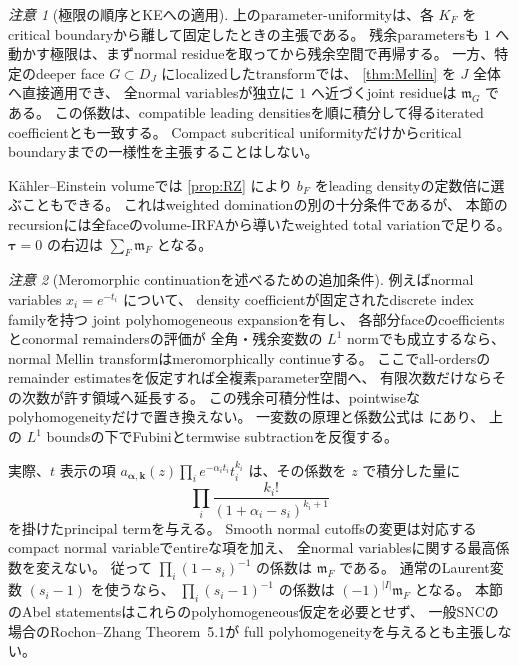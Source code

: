 \documentclass[11pt,a4paper]{ltjsarticle}
\theoremstyle{plain}
\theoremstyle{definition}
\theoremstyle{remark}
\newtheorem{remark}[remark]{注意}
\begin{document}
\begin{remark}[極限の順序とKEへの適用]
上のparameter-uniformityは、各 $K_F$ をcritical boundaryから離して固定したときの主張である。
残余parametersも $1$ へ動かす極限は、まずnormal residueを取ってから残余空間で再帰する。
一方、特定のdeeper face $G\subset D_J$ にlocalizedしたtransformでは、
\cref{thm:Mellin} を $J$ 全体へ直接適用でき、
全normal variablesが独立に $1$ へ近づくjoint residueは $\mathfrak m_G$ である。
この係数は、compatible leading densitiesを順に積分して得るiterated coefficientとも一致する。
Compact subcritical uniformityだけからcritical boundaryまでの一様性を主張することはしない。

K\"ahler--Einstein volumeでは \cref{prop:RZ} により
$b_F$ をleading densityの定数倍に選ぶこともできる。
これはweighted dominationの別の十分条件であるが、
本節のrecursionには全faceのvolume-IRFAから導いたweighted total variationで足りる。
$\bm\tau=0$ の右辺は $\sum_F\mathfrak m_F$ となる。
\end{remark}

\begin{remark}[Meromorphic continuationを述べるための追加条件]
\label{rem:Mellin-continuation}
例えばnormal variables $x_i=e^{-t_i}$ について、
density coefficientが固定されたdiscrete index familyを持つ
joint polyhomogeneous expansionを有し、
各部分faceのcoefficientsとconormal remaindersの評価が
全角・残余変数の $L^1$ normでも成立するなら、
normal Mellin transformはmeromorphically continueする。
ここでall-ordersのremainder estimatesを仮定すれば全複素parameter空間へ、
有限次数だけならその次数が許す領域へ延長する。
この残余可積分性は、pointwiseなpolyhomogeneityだけで置き換えない。
一変数の原理と係数公式は
\cite[Theorem~2.12, equations (29)--(31)]{GrieserPhg} にあり、
上の $L^1$ boundsの下でFubiniとtermwise subtractionを反復する。

実際、$t$ 表示の項
$a_{\bm\alpha,\bm k}(z)\prod_i e^{-\alpha_i t_i}t_i^{k_i}$
は、その係数を $z$ で積分した量に
\[
 \prod_i\frac{k_i!}{(1+\alpha_i-s_i)^{k_i+1}}
\]
を掛けたprincipal termを与える。
Smooth normal cutoffsの変更は対応するcompact normal variableでentireな項を加え、
全normal variablesに関する最高係数を変えない。
従って $\prod_i(1-s_i)^{-1}$ の係数は $\mathfrak m_F$ である。
通常のLaurent変数 $(s_i-1)$ を使うなら、
$\prod_i(s_i-1)^{-1}$ の係数は $(-1)^{|I|}\mathfrak m_F$ となる。
本節のAbel statementsはこれらのpolyhomogeneous仮定を必要とせず、
一般SNCの場合のRochon--Zhang Theorem~5.1が
full polyhomogeneityを与えるとも主張しない。
\end{remark}
\end{document}
